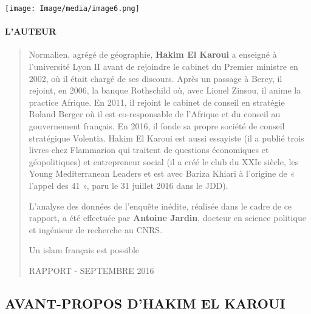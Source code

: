 \texttt{[image: Image/media/image6.png]}

\hypertarget{lauteur}{%
\paragraph{L'AUTEUR}\label{lauteur}}

\begin{quote}
Normalien, agrégé de géographie, \textbf{Hakim El Karoui} a enseigné à
l'université Lyon II avant de rejoindre le cabinet du Premier ministre
en 2002, où il était chargé de ses discours. Après un passage à Bercy,
il rejoint, en 2006, la banque Rothschild où, avec Lionel Zinsou, il
anime la practice Afrique. En 2011, il rejoint le cabinet de conseil en
stratégie Roland Berger où il est co-responsable de l'Afrique et du
conseil au gouvernement français. En 2016, il fonde sa propre société de
conseil stratégique Volentia. Hakim El Karoui est aussi essayiste (il a
publié trois livres chez Flammarion qui traitent de questions
économiques et géopolitiques) et entrepreneur social (il a créé le club
du XXIe siècle, les Young Mediterranean Leaders et est avec Bariza
Khiari à l'origine de « l'appel des 41 », paru le 31 juillet 2016 dans
le JDD).

L'analyse des données de l'enquête inédite, réalisée dans le cadre de ce
rapport, a été effectuée par \textbf{Antoine Jardin}, docteur en science
politique et ingénieur de recherche au CNRS.

Un islam français est possible

RAPPORT - SEPTEMBRE 2016
\end{quote}

\hypertarget{avant-propos-dhakim-el-karoui}{%
\subsection{AVANT-PROPOS D'HAKIM EL
KAROUI}\label{avant-propos-dhakim-el-karoui}}


